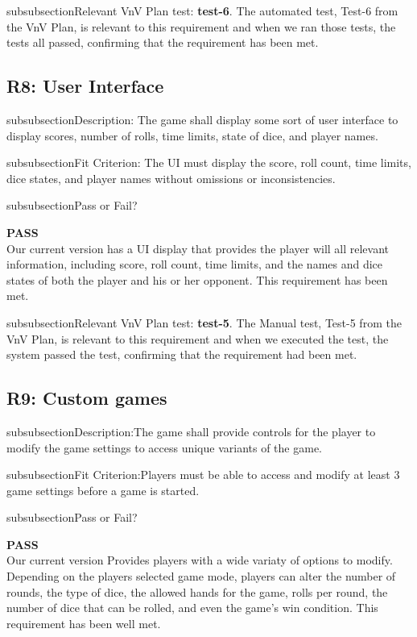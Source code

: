 \documentclass[12pt, titlepage]{article}
\begin{document}
\*subsubsection{Relevant VnV Plan test: } \textbf{test-6}.  The automated test, Test-6 from the VnV Plan, is relevant to this requirement and when we ran those tests, the tests all passed, confirming that the requirement has been met.

\subsection{R8: User Interface} 

\*subsubsection{Description:}  The game shall display some sort of user interface to display scores, number of rolls, time limits, state of dice, and player names.

\*subsubsection{Fit Criterion:} The UI must display the score, roll count, time limits, dice states, and player names without omissions or inconsistencies.

\*subsubsection{Pass or Fail?} 

 \noindent \textbf{PASS}\\
 
 \noindent Our current version has a UI display that provides the player will all relevant information, including score, roll count, time limits, and the names and dice states of both the player and his or her opponent. This requirement has been met.

\*subsubsection{Relevant VnV Plan test: } \textbf{test-5}.  The Manual test, Test-5 from the VnV Plan, is relevant to this requirement and when we executed the test, the system passed the test, confirming that the requirement had been met.

\subsection{R9: Custom games} 

\*subsubsection{Description:}The game shall provide controls for the player to modify the game settings to access unique variants of the game.

\*subsubsection{Fit Criterion:}Players must be able to access and modify at least 3 game settings before a game is started.

\*subsubsection{Pass or Fail?} 

 \noindent \textbf{PASS}\\
 
 \noindent Our current version Provides players with a wide variaty of options to modify. Depending on the players selected game mode, players can alter the number of rounds, the type of dice, the allowed hands for the game, rolls per round, the number of dice that can be rolled, and even the game's win condition. This requirement has been well met.
\end{document}
